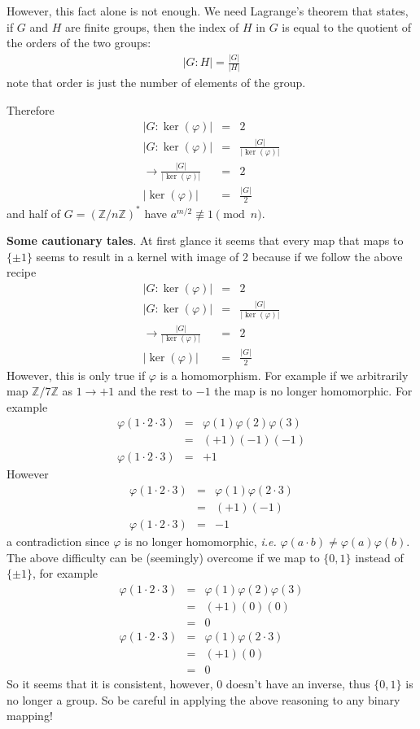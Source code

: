 \documentclass[aps,preprint,preprintnumbers,nofootinbib,showpacs,prd]{revtex4-1}
\newcommand{\ie}{{\it i.e.} }
\newcommand{\nbea}{\begin{eqnarray*}}
\newcommand{\neea}{\end{eqnarray*}}
\begin{document}
However, this fact alone is not enough. We need Lagrange's theorem that states, if $G$ and $H$ are finite groups, then the index of $H$ in $G$ is equal to the quotient of the orders of the two groups:
%
\nbea
|G:H| = \frac{|G|}{|H|}
\neea
%
note that order is just the number of elements of the group.

Therefore 
%
\nbea
|G:\ker(\varphi)| & = & 2 \\
|G:\ker(\varphi)| & = & \frac{|G|}{|\ker(\varphi)|} \\
\to \frac{|G|}{|\ker(\varphi)|} & = & 2 \\
|\ker(\varphi)| & = & \frac{|G|}{2}
\neea
%
and half of $G = (\mathbb{Z}/n\mathbb{Z})^*$ have $a^{m/2} \not\equiv 1 \pmod{n}$.

{\bf Some cautionary tales}. At first glance it seems that every map that maps to $\{\pm1\}$ seems to result in a kernel with image of 2 because if we follow the above recipe
%
\nbea
|G:\ker(\varphi)| & = & 2 \\
|G:\ker(\varphi)| & = & \frac{|G|}{|\ker(\varphi)|} \\
\to \frac{|G|}{|\ker(\varphi)|} & = & 2 \\
|\ker(\varphi)| & = & \frac{|G|}{2}
\neea
%
However, this is only true if $\varphi$ is a homomorphism. For example if we arbitrarily map $\mathbb{Z}/7\mathbb{Z}$ as $1 \to +1$ and the rest to $-1$ the map is no longer homomorphic. For example
%
\nbea
\varphi(1\cdot2\cdot3) & = & \varphi(1)\varphi(2)\varphi(3) \\
& = & (+1)(-1)(-1) \\
\varphi(1\cdot2\cdot3) & = & +1
\neea
%
However
%
\nbea
\varphi(1\cdot2\cdot3) & = & \varphi(1)\varphi(2\cdot 3) \\
& = & (+1)(-1) \\
\varphi(1\cdot2\cdot3) & = & -1
\neea
%
a contradiction since $\varphi$ is no longer homomorphic, \ie $\varphi(a\cdot b) \neq \varphi(a)\varphi(b)$. The above difficulty can be (seemingly) overcome if we map to $\{0,1\}$ instead of $\{\pm1\}$, for example
%
\nbea
\varphi(1\cdot2\cdot3) & = & \varphi(1)\varphi(2)\varphi(3) \\
& = & (+1)(0)(0) \\
& = & 0 \\
\varphi(1\cdot2\cdot3) & = & \varphi(1)\varphi(2\cdot 3) \\
& = & (+1)(0) \\
& = & 0
\neea
%
So it seems that it is consistent, however, $0$ doesn't have an inverse, thus $\{0,1\}$ is no longer a group. So be careful in applying the above reasoning to any binary mapping!
\end{document}

